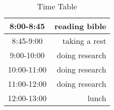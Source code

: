 \documentclass{article}
\begin{document}
 
\begin{table}[!t]
\centering
\caption{\label{Summarization of experiment results}Time Table}
 
\begin{tabular}{|c|r|}
\hline
8:00-8:45 &  reading bible \\
\hline\hline
8:45-9:00 & taking a rest  \\
\hline
9:00-10:00 & doing research \\
\hline
10:00-11:00 & doing research \\
\hline
11:00-12:00 & doing research \\
\hline
12:00-13:00 & lunch \\
\hline
\end{tabular}
 \end{table}
\end{document}
